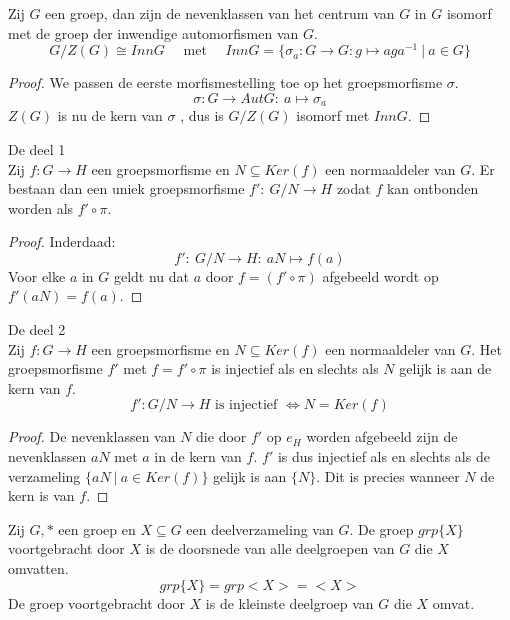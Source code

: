 \documentclass[main.tex]{subfiles}
\begin{document}
\begin{pr}
  Zij $G$ een groep, dan zijn de nevenklassen van het centrum van $G$ in $G$ isomorf met de groep der inwendige automorfismen van $G$.
  \[ G/Z(G) \cong Inn G \quad\text{ met }\quad Inn G = \{ \sigma_{a}: G \rightarrow G: g \mapsto aga^{-1} \ |\ a\in G \} \]

  \begin{proof}
    We passen de eerste morfismestelling toe op het groepsmorfisme $\sigma$.
    \[ \sigma: G \rightarrow Aut G:\ a \mapsto \sigma_{a} \]
    $Z(G)$ is nu de kern van $\sigma$ \waarom , dus is $G/Z(G)$ isomorf met $Inn G$.
  \end{proof}
\end{pr}

\begin{st}
  De  deel 1\\
  Zij $f: G\rightarrow H$ een groepsmorfisme en $N\subseteq Ker(f)$ een normaaldeler van $G$.
  Er bestaan dan een uniek groepsmorfisme $f':\ G/N \rightarrow H$ zodat $f$ kan ontbonden worden als $f'\circ \pi$.

  \begin{proof}
    Inderdaad:
    \[ f':\ G/N \rightarrow H:\ aN \mapsto f(a) \]
    Voor elke $a$ in $G$ geldt nu dat $a$ door $f= (f' \circ \pi)$ afgebeeld wordt op $f'(aN) = f(a)$.
  \end{proof}
\end{st}

\begin{st}
  De  deel 2\\
  Zij $f: G\rightarrow H$ een groepsmorfisme en $N\subseteq Ker(f)$ een normaaldeler van $G$.
  Het groepsmorfisme $f'$ met $f = f'\circ \pi$ is injectief als en slechts als $N$ gelijk is aan de kern van $f$.
  \[ f':G/N \rightarrow H \text{ is injectief } \Leftrightarrow N = Ker(f) \]

  \begin{proof}
    De nevenklassen van $N$ die door $f'$ op $e_{H}$ worden afgebeeld zijn de nevenklassen $aN$ met $a$ in de kern van $f$.
    $f'$ is dus injectief als en slechts als de verzameling $\{ aN \ |\ a \in Ker(f) \}$ gelijk is aan $\{ N \}$.
    Dit is precies wanneer $N$ de kern is van $f$.
  \end{proof}
\end{st}

\begin{de}
  Zij $G,*$ een groep en $X \subseteq G$ een deelverzameling van $G$.
  De groep $grp\{X\}$ voortgebracht door $X$ is de doorsnede van alle deelgroepen van $G$ die $X$ omvatten. 
  \[ grp\{X\} = grp<X> = <X> \]
  De groep voortgebracht door $X$ is de kleinste deelgroep van $G$ die $X$ omvat.
\end{de}
\end{document}
